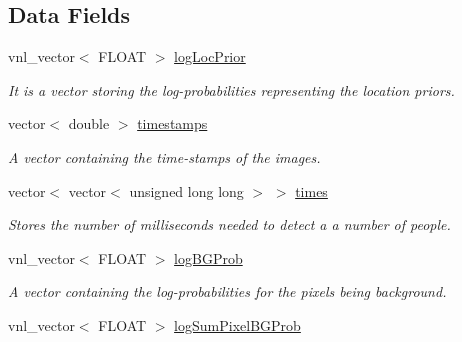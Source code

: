 \subsection*{Data Fields}
\begin{DoxyCompactItemize}
\item 
\hypertarget{classfindperson_a337c4cd7f149bc0c775c244d75ed9293}{
vnl\_\-vector$<$ FLOAT $>$ \hyperlink{classfindperson_a337c4cd7f149bc0c775c244d75ed9293}{logLocPrior}}
\label{classfindperson_a337c4cd7f149bc0c775c244d75ed9293}

\begin{DoxyCompactList}\small\item\em It is a vector storing the log-\/probabilities representing the location priors. \item\end{DoxyCompactList}\item 
\hypertarget{classfindperson_ada03328a9187736162c7277d89ef159e}{
vector$<$ double $>$ \hyperlink{classfindperson_ada03328a9187736162c7277d89ef159e}{timestamps}}
\label{classfindperson_ada03328a9187736162c7277d89ef159e}

\begin{DoxyCompactList}\small\item\em A vector containing the time-\/stamps of the images. \item\end{DoxyCompactList}\item 
\hypertarget{classfindperson_ac150111bafc331bafb353619452c5c5c}{
vector$<$ vector$<$ unsigned long long $>$ $>$ \hyperlink{classfindperson_ac150111bafc331bafb353619452c5c5c}{times}}
\label{classfindperson_ac150111bafc331bafb353619452c5c5c}

\begin{DoxyCompactList}\small\item\em Stores the number of milliseconds needed to detect a a number of people. \item\end{DoxyCompactList}\item 
\hypertarget{classfindperson_adf313582371b7197c79848aa871c700b}{
vnl\_\-vector$<$ FLOAT $>$ \hyperlink{classfindperson_adf313582371b7197c79848aa871c700b}{logBGProb}}
\label{classfindperson_adf313582371b7197c79848aa871c700b}

\begin{DoxyCompactList}\small\item\em A vector containing the log-\/probabilities for the pixels being background. \item\end{DoxyCompactList}\item 
\hypertarget{classfindperson_a7d55fe31445fcd7529814d4e5e1ec3ff}{
vnl\_\-vector$<$ FLOAT $>$ \hyperlink{classfindperson_a7d55fe31445fcd7529814d4e5e1ec3ff}{logSumPixelBGProb}}
\label{classfindperson_a7d55fe31445fcd7529814d4e5e1ec3ff}


\end{DoxyCompactItemize}
